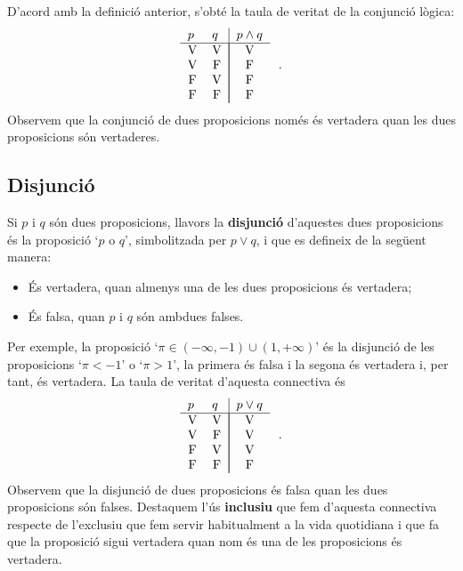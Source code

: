 D'acord amb la definici\'{o} anterior, s'obt\'{e} la taula de veritat de la
conjunci\'{o} l\`{o}gica:%
\begin{equation*}
\begin{tabular}{ll|l}
$p$ & $q$ & $p\wedge q$ \\ \hline
\multicolumn{1}{c}{V} & \multicolumn{1}{c|}{V} & \multicolumn{1}{|c}{V} \\
\multicolumn{1}{c}{V} & \multicolumn{1}{c|}{F} & \multicolumn{1}{|c}{F} \\
\multicolumn{1}{c}{F} & \multicolumn{1}{c|}{V} & \multicolumn{1}{|c}{F} \\
\multicolumn{1}{c}{F} & \multicolumn{1}{c|}{F} & \multicolumn{1}{|c}{F}%
\end{tabular}
\text{.}
\end{equation*}
Observem que la conjunci\'{o} de dues proposicions nom\'{e}s \'{e}s
vertadera quan les dues proposicions s\'{o}n vertaderes.

\subsection{Disjunci\'{o}}

Si $p$ i $q$ s\'{o}n dues proposicions, llavors la \textbf{disjunci\'{o}}
d'aquestes dues proposicions \'{e}s la proposici\'{o} `$p$ o $q$',
simbolitzada per $p\vee q$, i que es defineix de la seg\"{u}ent manera:

\begin{itemize}
\item \'{E}s vertadera, quan almenys una de les dues proposicions \'{e}s
vertadera;

\item \'{E}s falsa, quan $p$ i $q$ s\'{o}n ambdues falses.
\end{itemize}

Per exemple, la proposici\'{o} `$\pi\in\left( -\infty,-1\right) \cup\left(
1,+\infty\right) $' \'{e}s la disjunci\'{o} de les proposicions `$\pi<-1$' o
`$\pi>1$', la primera \'{e}s falsa i la segona \'{e}s vertadera i, per tant,
\'{e}s vertadera. La taula de veritat d'aquesta connectiva \'{e}s%
\begin{equation*}
\begin{tabular}{ll|l}
$p$ & $q$ & $p\vee q$ \\ \hline
\multicolumn{1}{c}{V} & \multicolumn{1}{c|}{V} & \multicolumn{1}{|c}{V} \\
\multicolumn{1}{c}{V} & \multicolumn{1}{c|}{F} & \multicolumn{1}{|c}{V} \\
\multicolumn{1}{c}{F} & \multicolumn{1}{c|}{V} & \multicolumn{1}{|c}{V} \\
\multicolumn{1}{c}{F} & \multicolumn{1}{c|}{F} & \multicolumn{1}{|c}{F}%
\end{tabular}
\text{.}
\end{equation*}
Observem que la disjunci\'{o} de dues proposicions \'{e}s falsa quan les
dues proposicions s\'{o}n falses. Destaquem l'\'{u}s \textbf{inclusiu} que
fem d'aquesta connectiva respecte de l'exclusiu que fem servir habitualment
a la vida quotidiana i que fa que la proposici\'{o} sigui vertadera quan nom%
\'{e}s una de les proposicions \'{e}s vertadera.

